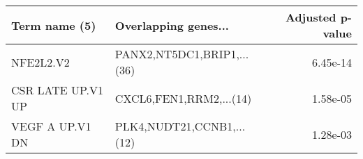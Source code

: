 \begin{tabular}{llr}
\toprule
    Term name (5) &       Overlapping genes... &  Adjusted p-value \\
\midrule
        NFE2L2.V2 & PANX2,NT5DC1,BRIP1,...(36) &          6.45e-14 \\
CSR LATE UP.V1 UP &    CXCL6,FEN1,RRM2,...(14) &          1.58e-05 \\
  VEGF A UP.V1 DN &  PLK4,NUDT21,CCNB1,...(12) &          1.28e-03 \\
\bottomrule
\end{tabular}
